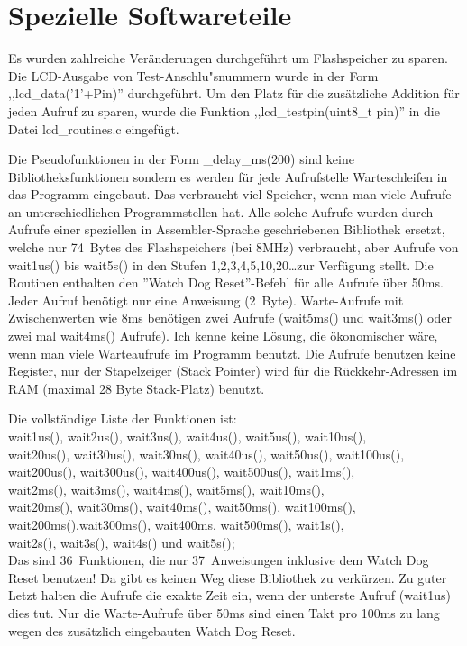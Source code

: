
\chapter{Spezielle Softwareteile}

Es wurden zahlreiche Ver\"anderungen durchgef\"uhrt um Flashspeicher zu sparen.
Die LCD-Ausgabe von Test-Anschlu"snummern wurde in der Form ,,lcd\_data('1'+Pin)'' durchgef\"uhrt.
Um den Platz f\"ur die zus\"atzliche Addition f\"ur jeden Aufruf zu sparen, wurde die
Funktion ,,lcd\_testpin(uint8\_t pin)'' in die Datei lcd\_routines.c eingef\"ugt.


Die Pseudofunktionen in der Form \_delay\_ms(200) sind keine Bibliotheksfunktionen
sondern es werden f\"ur jede Aufrufstelle Warteschleifen in das Programm eingebaut.
Das verbraucht viel Speicher, wenn man viele Aufrufe an unterschiedlichen Programmstellen hat.
Alle solche Aufrufe wurden durch Aufrufe einer speziellen in Assembler-Sprache geschriebenen
Bibliothek ersetzt, welche nur 74~Bytes des Flashspeichers (bei 8MHz) verbraucht, aber
Aufrufe von wait1us() bis wait5s() in den Stufen 1,2,3,4,5,10,20\dots zur Verf\"ugung stellt.
Die Routinen enthalten den ''Watch Dog Reset''-Befehl f\"ur alle Aufrufe \"uber 50ms.
Jeder Aufruf ben\"otigt nur eine Anweisung (2~Byte). Warte-Aufrufe mit Zwischenwerten
wie 8ms ben\"otigen zwei Aufrufe (wait5ms() und wait3ms() oder zwei mal wait4ms() Aufrufe).
Ich kenne keine L\"osung, die \"okonomischer w\"are, wenn man viele Warteaufrufe im Programm benutzt.
Die Aufrufe benutzen keine Register, nur der Stapelzeiger (Stack Pointer) wird f\"ur die R\"uckkehr-Adressen
im RAM (maximal 28 Byte Stack-Platz) benutzt.

Die vollst\"andige Liste der Funktionen ist:\\
wait1us(), wait2us(), wait3us(), wait4us(), wait5us(), wait10us(), \\
wait20us(), wait30us(), wait30us(), wait40us(), wait50us(), wait100us(), \\
wait200us(), wait300us(), wait400us(), wait500us(), wait1ms(),\\
wait2ms(), wait3ms(), wait4ms(), wait5ms(), wait10ms(),\\
wait20ms(), wait30ms(), wait40ms(), wait50ms(), wait100ms(),\\
wait200ms(),wait300ms(), wait400ms, wait500ms(), wait1s(),\\
wait2s(), wait3s(), wait4s() und wait5s();\\
Das sind 36~Funktionen, die nur 37~Anweisungen inklusive dem Watch Dog Reset benutzen!
Da gibt es keinen Weg diese Bibliothek zu verk\"urzen.
Zu guter Letzt halten die Aufrufe die exakte Zeit ein, wenn der unterste Aufruf (wait1us) dies tut.
Nur die Warte-Aufrufe \"uber 50ms sind einen Takt pro 100ms zu lang wegen des zus\"atzlich eingebauten
Watch Dog Reset.


